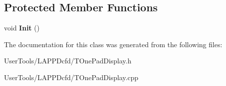 \subsection*{Protected Member Functions}
\begin{DoxyCompactItemize}
\item 
\hypertarget{classTOnePadDisplay_ac4b99626bd39ddfa57b2dddbdeed93c7}{
void {\bfseries Init} ()}
\label{classTOnePadDisplay_ac4b99626bd39ddfa57b2dddbdeed93c7}

\end{DoxyCompactItemize}


The documentation for this class was generated from the following files:\begin{DoxyCompactItemize}
\item 
UserTools/LAPPDcfd/TOnePadDisplay.h\item 
UserTools/LAPPDcfd/TOnePadDisplay.cpp\end{DoxyCompactItemize}
